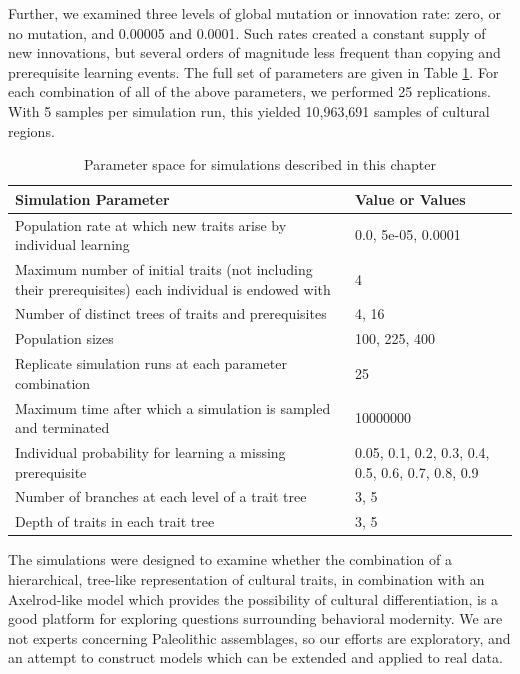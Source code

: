 \documentclass[graybox,natbib]{svmult}
\begin{document}
Further, we examined three levels of global mutation or innovation rate:
zero, or no mutation, and 0.00005 and 0.0001. Such rates created a
constant supply of new innovations, but several orders of magnitude less
frequent than copying and prerequisite learning events. The full set of
parameters are given in Table \ref{tab:axelrodct-sim-parameters}. For
each combination of all of the above parameters, we performed 25
replications.  With 5 samples per simulation run, this yielded 10,963,691 samples of cultural regions.  

\begin{table}[H]
\begin{tabular}{|p{}|p{}|}
\hline
\textbf{Simulation Parameter} & \textbf{Value or Values} \\ 
\hline
Population rate at which new traits arise by individual learning & 0.0, 5e-05, 0.0001\\ 
 \hline 
Maximum number of initial traits (not including their prerequisites) each individual is endowed with & 4\\ 
 \hline 
Number of distinct trees of traits and prerequisites & 4, 16\\ 
 \hline 
Population sizes & 100, 225, 400\\ 
 \hline 
Replicate simulation runs at each parameter combination & 25\\ 
 \hline 
Maximum time after which a simulation is sampled and terminated & 10000000\\ 
 \hline 
Individual probability for learning a missing prerequisite & 0.05, 0.1, 0.2, 0.3, 0.4, 0.5, 0.6, 0.7, 0.8, 0.9\\ 
 \hline 
Number of branches at each level of a trait tree & 3, 5\\ 
 \hline 
Depth of traits in each trait tree & 3, 5\\ 
 \hline 
\hline
\end{tabular}
\caption{Parameter space for simulations described in this chapter}
\label{tab:axelrodct-sim-parameters}
\end{table}



The simulations were designed to examine whether the combination of a
hierarchical, tree-like representation of cultural traits, in
combination with an Axelrod-like model which provides the possibility of
cultural differentiation, is a good platform for exploring questions
surrounding behavioral modernity. We are not experts concerning
Paleolithic assemblages, so our efforts are exploratory, and an attempt
to construct models which can be extended and applied to real data.
\end{document}
